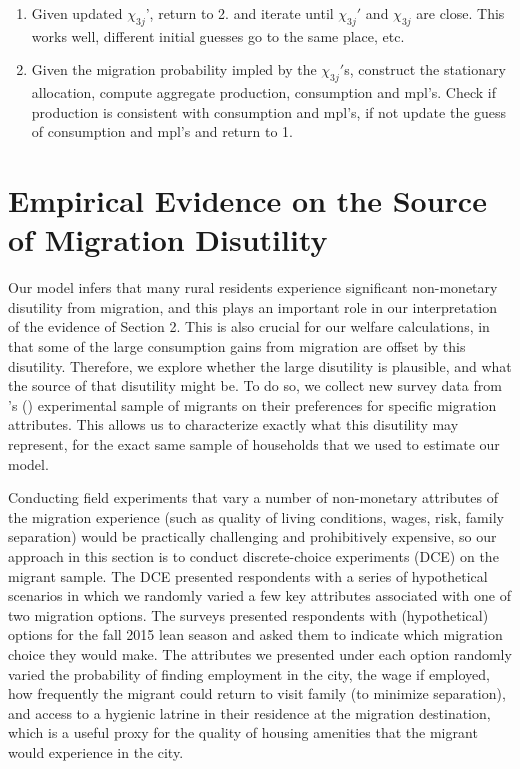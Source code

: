 \documentclass[12pt,pdftex]{article}
\def\thesection{\arabic{section}}
\def\citeapos#1{\citeauthor{#1}'s (\citeyear{#1})}
\begin{document}
\begin{enumerate}
\item Given updated $\chi_{3j}$', return to 2. and iterate until $\chi_{3j}'$ and $\chi_{3j}$ are close. This works well, different initial guesses go to the same place, etc.

\item Given the migration probability impled by the $\chi_{3j}'$s, construct the stationary allocation, compute aggregate production, consumption and mpl's. Check if production is consistent with consumption and mpl's, if not update the guess of consumption and mpl's and return to 1.
\end{enumerate}


\newpage
\clearpage

\setcounter{figure}{0}
\setcounter{table}{0}

\section{Empirical Evidence on the Source of Migration Disutility \label{sec:discrete_choice}}

Our model infers that many rural residents experience significant non-monetary disutility from migration, and this plays an important role in our interpretation of the evidence of Section 2. This is also crucial for our welfare calculations, in that some of the large consumption gains from migration are offset by this disutility. Therefore, we explore whether the large disutility is plausible, and what the source of that disutility might be. To do so, we collect new survey data from \citeapos{brch14} experimental sample of migrants on their preferences for specific migration attributes.  This allows us to characterize exactly what this disutility may represent, for the exact same sample of households that we used to estimate our model.

Conducting field experiments that vary a number of non-monetary attributes of the migration experience (such as quality of living conditions, wages, risk, family separation) would be practically challenging and prohibitively expensive, so our approach in this section is to conduct discrete-choice experiments (DCE) on the migrant sample. The DCE presented respondents with a series of hypothetical scenarios in which we randomly varied a few key attributes associated with one of two migration options. The surveys presented respondents with (hypothetical) options for the fall 2015 lean season and asked them to indicate which migration choice they would make. The attributes we presented under each option randomly varied the probability of finding employment in the city, the wage if employed, how frequently the migrant could return to visit family (to minimize separation), and access to a hygienic latrine in their residence at the migration destination, which is a useful proxy for the quality of housing amenities that the migrant would experience in the city.
\end{document}
